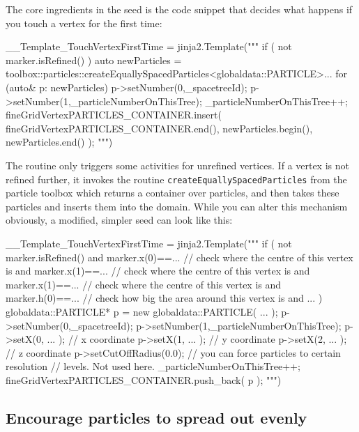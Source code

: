 \noindent
The core ingredients in the seed is the code snippet that decides what happens
if you touch a vertex for the first time:
\begin{code}
  __Template_TouchVertexFirstTime = jinja2.Template("""
  if ( not marker.isRefined() ) {
    auto newParticles =
    toolbox::particles::createEquallySpacedParticles<globaldata::{{PARTICLE}}>...
    for (auto& p: newParticles) {
      p->setNumber(0,_spacetreeId);
      p->setNumber(1,_particleNumberOnThisTree);
      _particleNumberOnThisTree++;
    }
    fineGridVertex{{PARTICLES_CONTAINER}}.insert( 
      fineGridVertex{{PARTICLES_CONTAINER}}.end(), newParticles.begin(),
      newParticles.end() 
    ); 
  }
""")
\end{code}

\noindent
The routine only triggers some activities for unrefined vertices. 
If a vertex is not refined further, it invokes the routine 
\texttt{createEquallySpacedParticles} from the particle toolbox which
returns a container over particles, and then takes these particles and 
inserts them into the domain.
While you can alter this mechanism obviously, a modified, simpler seed can look
like this:

\begin{code}
  __Template_TouchVertexFirstTime = jinja2.Template("""
  if ( 
    not marker.isRefined() 
    and
    marker.x(0)==...      // check where the centre of this vertex is
    and
    marker.x(1)==...      // check where the centre of this vertex is
    and
    marker.x(1)==...      // check where the centre of this vertex is
    and
    marker.h(0)==...      // check how big the area around this vertex is
    and
    ...
  ) {
    globaldata::{{PARTICLE}}* p = new globaldata::{{PARTICLE}}( ... ); 
    p->setNumber(0,_spacetreeId);
    p->setNumber(1,_particleNumberOnThisTree);
    p->setX(0, ... );     // x coordinate
    p->setX(1, ... );     // y coordinate
    p->setX(2, ... );     // z coordinate
    p->setCutOffRadius(0.0); // you can force particles to certain resolution 
                             // levels. Not used here.
    _particleNumberOnThisTree++;
    fineGridVertex{{PARTICLES_CONTAINER}}.push_back( p ); 
  }
""")
\end{code}





\subsection{Encourage particles to spread out evenly}

